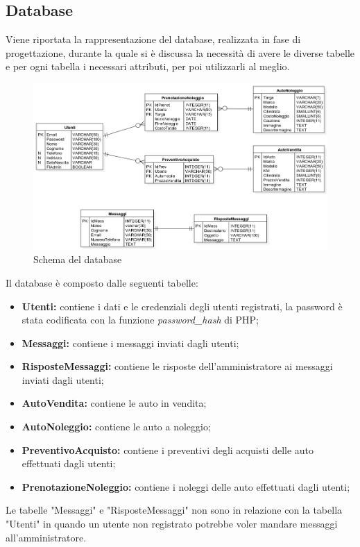     \subsection{Database}
    Viene riportata la rappresentazione del database, realizzata in fase di progettazione, durante la quale si è discussa la necessità di avere le diverse tabelle e per ogni tabella i necessari attributi, per poi utilizzarli al meglio.
    \begin{figure}[H]
        \centering
        \includegraphics[width=14cm]{./img/database.png}
        \caption{Schema del database}  \label{fig:xray}
    \end{figure}
    Il database è composto dalle seguenti tabelle:
    \begin{itemize}
        \item \textbf{Utenti:} contiene i dati e le credenziali degli utenti registrati, la password è stata codificata con la funzione \textit{password\_hash} di PHP;
        \item \textbf{Messaggi:} contiene i messaggi inviati dagli utenti;
        \item \textbf{RisposteMessaggi:} contiene le risposte dell'amministratore ai messaggi inviati dagli utenti;
        \item \textbf{AutoVendita:} contiene le auto in vendita;
        \item \textbf{AutoNoleggio:} contiene le auto a noleggio;
        \item \textbf{PreventivoAcquisto:} contiene i preventivi degli acquisti delle auto effettuati dagli utenti;
        \item \textbf{PrenotazioneNoleggio:} contiene i noleggi delle auto effettuati dagli utenti;
    \end{itemize}

    Le tabelle "Messaggi" e "RisposteMessaggi" non sono in relazione con la tabella "Utenti" in quando un utente non registrato potrebbe voler mandare messaggi all'amministratore.
    
